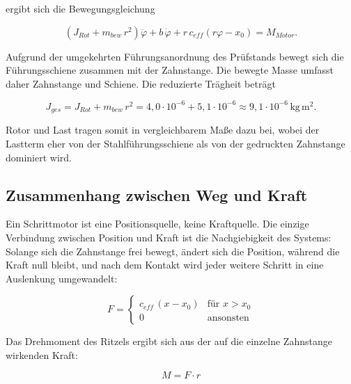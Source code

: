ergibt sich die Bewegungsgleichung

\begin{equation}
    \left(J_{Rot} + m_{bew}\,r^2\right)\ddot{\varphi}
    + b\,\dot{\varphi}
    + r\,c_{eff}\left(r\varphi - x_0\right)
    = M_{Motor} .
    \label{eq:bewegungsgleichung}
\end{equation}

Aufgrund der umgekehrten Führungsanordnung des Prüfstands bewegt sich die Führungsschiene
zusammen mit der Zahnstange. Die bewegte Masse umfasst daher Zahnstange und Schiene. Die reduzierte Trägheit beträgt

\begin{equation}
    J_{ges} = J_{Rot} + m_{bew}\,r^2
    = 4,0 \cdot 10^{-6} + 5,1 \cdot 10^{-6}
    \approx 9,1 \cdot 10^{-6}\,\mathrm{kg\,m^2} .
    \label{eq:traegheit}
\end{equation}

Rotor und Last tragen somit in vergleichbarem Maße dazu bei, wobei der Lastterm
eher von der Stahlführungsschiene als von der gedruckten Zahnstange dominiert wird.

\subsection*{Zusammenhang zwischen Weg und Kraft}

Ein Schrittmotor ist eine Positionsquelle, keine Kraftquelle. Die einzige Verbindung zwischen
Position und Kraft ist die Nachgiebigkeit des Systems: Solange sich die Zahnstange
frei bewegt, ändert sich die Position, während die Kraft null bleibt, und nach dem Kontakt wird jeder
weitere Schritt in eine Auslenkung umgewandelt:

\begin{equation}
    F =
    \begin{cases}
        c_{eff}\,(x - x_0) & \text{für } x > x_0 \\[2pt]
        0                  & \text{ansonsten}
    \end{cases}
    \label{eq:federmodell}
\end{equation}


Das Drehmoment des Ritzels ergibt sich aus der auf die einzelne Zahnstange wirkenden Kraft:

\begin{equation}
    M = F \cdot r
    \label{eq:moment_pruefstand}
\end{equation}

